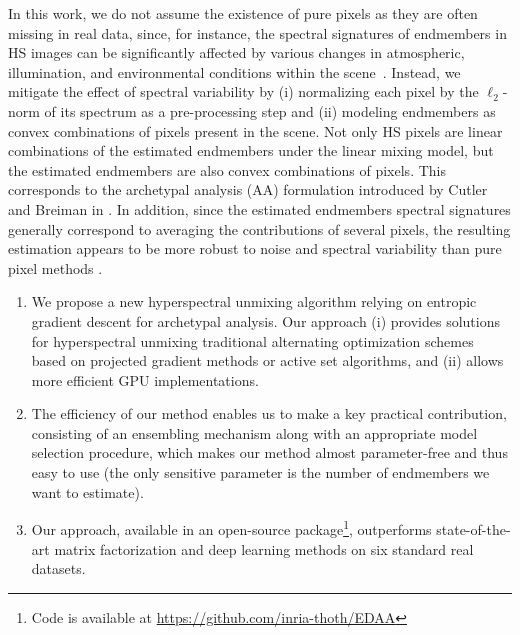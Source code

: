 In this work, we do not assume the existence of pure pixels as they are often missing in real data, since, for instance, the spectral signatures of endmembers in HS images can be significantly affected by various changes in atmospheric, illumination, and environmental conditions within the scene~\cite{borsoi_spectral_2021}. 
Instead, we mitigate the effect of spectral variability by (i) normalizing each pixel by the $\ell_2$-norm of its spectrum as a pre-processing step and (ii) modeling endmembers as convex combinations of pixels present in the scene.
Not only HS pixels are linear combinations of the estimated endmembers under the linear mixing model, but the estimated endmembers are also convex combinations of pixels. 
This corresponds to the archetypal analysis (AA) formulation introduced by Cutler and Breiman in \cite{cutler_archetypal_1994}.
In addition, since the estimated endmembers spectral signatures generally correspond to averaging the contributions of several pixels, the resulting estimation appears to be more robust to noise and spectral variability than pure pixel methods .

  \begin{enumerate}
  \item We propose a new hyperspectral unmixing algorithm relying on entropic gradient descent for archetypal analysis. 
  Our approach (i) provides solutions for hyperspectral unmixing  traditional alternating optimization schemes based on projected gradient methods or active set algorithms, and (ii) allows more efficient GPU implementations.
  \item The efficiency of our method enables us to make a key practical contribution, consisting of an ensembling mechanism along with an appropriate model selection procedure, which makes our method almost parameter-free and thus easy to use (the only sensitive parameter is the number of endmembers we want to estimate).
  \item Our approach, available in an open-source package\footnote{Code is available at \href{https://github.com/inria-thoth/EDAA}{https://github.com/inria-thoth/EDAA}}, outperforms state-of-the-art matrix factorization and deep learning methods on six standard real datasets.
  \end{enumerate}


